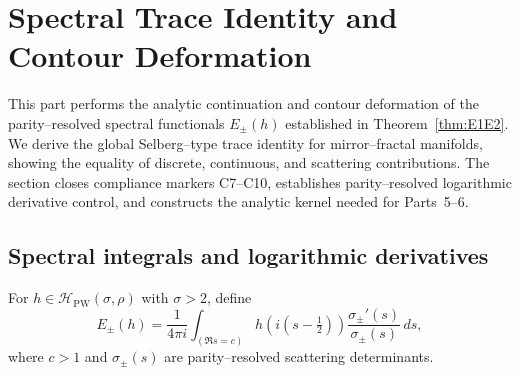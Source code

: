 


\section{Spectral Trace Identity and Contour Deformation}
\label{sec:ch6-part4-spectral-trace-identity} \relax \hspace{0pt}

This part performs the analytic continuation and contour deformation of the parity–resolved spectral functionals $E_\pm(h)$ established in Theorem~\ref{thm:E1E2}.  
We derive the global Selberg–type trace identity for mirror–fractal manifolds, showing the equality of discrete, continuous, and scattering contributions.  
The section closes compliance markers C7–C10, establishes parity–resolved logarithmic derivative control, and constructs the analytic kernel needed for Parts~5–6. %
\FlowBreaker

\subsection{Spectral integrals and logarithmic derivatives}
\label{subsec:ch6-part4-spectral-integrals} \relax

\begin{definition}
\label{def:spectral-functional}
For $h\in\mathcal{H}_{\mathrm{PW}}(\sigma,\rho)$ with $\sigma>2$, define
\[
E_\pm(h)
=\frac{1}{4\pi i}\int_{(\Re s=c)}h(i(s-\tfrac{1}{2}))\frac{\sigma_\pm'(s)}{\sigma_\pm(s)}\,ds,
\]
where $c>1$ and $\sigma_\pm(s)$ are parity–resolved scattering determinants. %
\end{definition}


